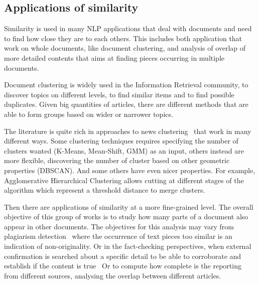 \subsection{Applications of similarity}

Similarity is used in many NLP applications that deal with documents and need to find how close they are to each others. This includes both application that work on whole documents, like document clustering, and analysis of overlap of more detailed contents that aims at finding pieces occurring in multiple documents.

Document clustering is widely used in the Information Retrieval community, to discover topics on different levels, to find similar items and to find possible duplicates. Given big quantities of articles, there are different methods that are able to form groups based on wider or narrower topics.

The literature is quite rich in approaches to news clustering~\cite{carpineto2009survey,jones1972statistical} %
that work in many different ways.
Some clustering techniques requires specifying the number of clusters wanted (K-Means, Mean-Shift, GMM) as an input, others instead are more flexible, discovering the number of cluster based on other geometric properties (DBSCAN).
And some others have even nicer properties.
For example, Agglomerative Hierarchical Clustering allows cutting at different stages of the algorithm which represent a threshold distance to merge clusters.






Then there are applications of similarity at a more fine-grained level.
The overall objective of this group of works is to study how many parts of a document also appear in other documents.
The objectives for this analysis may vary from plagiarism detection~\cite{potthast2010evaluation} where the occurrence of text pieces too similar is an indication of non-originality.
Or in the fact-checking perspectives, when external confirmation is searched about a specific detail to be able to corroborate and establish if the content is true~\cite{TODO}
Or to compute how complete is the reporting from different sources, analysing the overlap between different articles.

